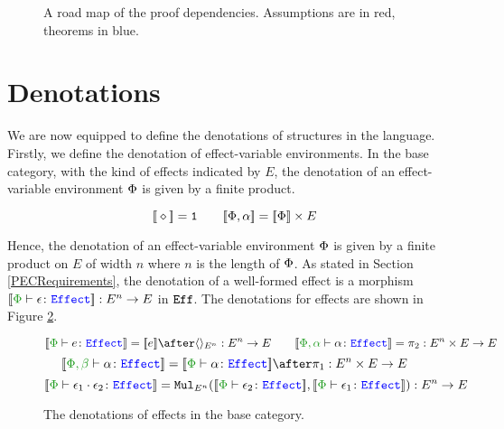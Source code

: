 \begin{figure}[H]
\begin{center}
{
    }
    \end{center}
\caption{A road map of the proof dependencies. Assumptions are in red, theorems in blue.}
\label{RoadMap}
\end{figure}


\section{Denotations}\label{PECDenotations}
We are now equipped to define the denotations of structures in the language. Firstly, we define the denotation of effect-variable environments. In the base category, with the kind of effects indicated by $E$, the denotation of an effect-variable environment $\P$ is given by a finite product.

\[
\deno{\nil} = \1 \quad\quad \deno{\P, \a} = \deno{\P}\times E    
\]

Hence, the denotation of an  effect-variable environment $\P$ is given by a finite product on $E$ of width $n$ where $n$ is the length of $\P$. As stated in Section \ref{PECRequirements}, the denotation of a well-formed effect is a morphism $\deno{\typerelation{\P}{\e}{\effect}}: E^n \rightarrow E$ in $\Eff$. The denotations for effects are shown in Figure \ref{EffectDenotations}.
\begin{figure}[H]
    \centering
    \begin{framed}
        \[
    \deno{\typerelation{\P}{e}{\effect}} = \deno{e} \after \term{E^n}: E^n\rightarrow E
    \quad\quad
    \deno{\typerelation{\P,\a}{\a}{\effect}} = \pp: E^n\times E \rightarrow E
\]\[
    \deno{\typerelation{\P, \b}{\a}{\effect}} = \deno{\typerelation{\P}{\a}{\effect}}\after\p: E^n\times E\rightarrow E
\]\[
    \deno{\typerelation{\P}{\e_1\dot \e_2}{\effect}} = \Mul_{E^n}(\deno{\typerelation{\P}{\e_2}{\effect}},\deno{\typerelation{\P}{\e_1}{\effect}}): E^n \rightarrow E
\]
    \end{framed}
    \caption{The denotations of effects in the base category.}
    \label{EffectDenotations}
\end{figure}


